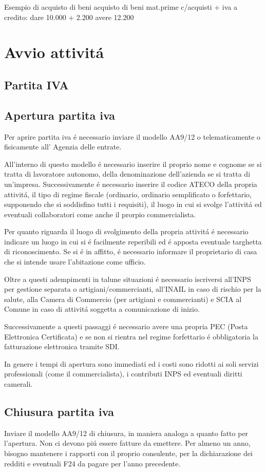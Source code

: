 \documentclass{article}
\begin{document}
Esempio di acquisto di beni
acquisto di beni
mat.prime c/acquisti +  iva a credito: dare 10.000 + 2.200
avere 12.200

\section{Avvio attivit\'a}
\subsection{Partita IVA}
\subsection{Apertura partita iva}
Per aprire partita iva \'e necessario inviare il modello AA9/12 o telematicamente o fisicamente all' Agenzia delle entrate. 

All'interno di questo modello \'e necessario inserire il proprio nome e cognome se si tratta di lavoratore autonomo, della denominazione dell'azienda se si tratta di un'impresa. Successivamente \'e necessario inserire il codice ATECO della propria attivit\'a, il tipo di regime fiscale (ordinario, ordinario semplificato o forfettario, supponendo che si soddisfino tutti i requisiti), il luogo in cui si svolge l'attivit\'a ed eventuali collaboratori come anche il prorpio commercialista.

Per quanto riguarda il luogo di svolgimento della propria attivit\'a \'e necessario indicare un luogo in cui si \'e facilmente reperibili ed \'e apposta eventuale targhetta di riconoscimento. Se si \'e in affitto, \'e necessario informare il proprietario di casa che si intende usare l'abitazione come ufficio.

Oltre a questi adempimenti in talune situazioni \'e necessario iscriversi all'INPS per gestione separata o artigiani/commercianti, all'INAIL in caso di rischio per la salute, alla Camera di Commercio (per artigiani e commercianti) e SCIA al Comune in caso di  attivit\'a soggetta a comunicazione di inizio.

Successivamente a questi passaggi \'e necessario avere una propria PEC (Posta Elettronica Certificata) e se non si rientra nel regime forfettario \'e obbligatoria la fatturazione elettronica tramite SDI. 

In genere i tempi di apertura sono immediati ed i costi sono ridotti ai soli servizi professionali (come il commercialista), i contributi INPS ed eventuali diritti camerali.

\subsection{Chiusura partita iva}
Inviare il modello AA9/12 di chiusura, in maniera analoga a quanto fatto per l'apertura. Non ci devono pi\'u essere fatture da emettere. Per almeno un anno, bisogno mantenere i rapporti con il proprio consulente, per la dichiarazione dei redditi e eventuali F24 da pagare per l'anno precedente.
\end{document}
